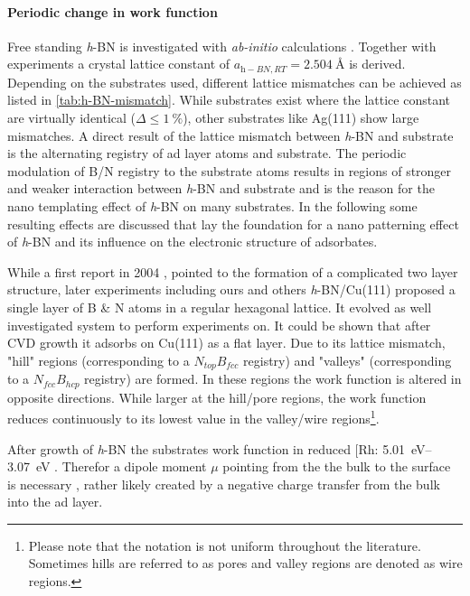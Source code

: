 \paragraph{Periodic change in work function}
Free standing \textit{h}-BN is investigated with \textit{ab-initio} calculations \cite{han_effects_2014,mortazavi_investigation_2012,topsakal_first-principles_2009,peng_mechanical_2012}. Together with experiments \cite{paszkowicz_lattice_2002} a crystal lattice constant of $a_{\textit{h}-BN, RT}=\SI{2.504}{\angstrom}$ is derived. Depending on the substrates used, different lattice mismatches can be achieved as listed in \autoref{tab:h-BN-mismatch}. While substrates exist where the lattice constant are virtually identical ($\Delta \leq \SI{1}{\percent}$), other substrates like Ag(111) show large mismatches. A direct result of the lattice mismatch between \textit{h}-BN and substrate is the alternating registry of ad layer atoms and substrate. The periodic modulation of B/N registry to the substrate atoms results in regions of stronger and weaker interaction between \textit{h}-BN and substrate and is the reason for the nano templating effect of \textit{h}-BN on many substrates. In the following some resulting effects are discussed that lay the foundation for a nano patterning effect of \textit{h}-BN and its influence on the electronic structure of adsorbates.

While a first report in 2004 \cite{corso_boron_2004}, pointed to the formation of a complicated two layer structure, later experiments \cite{roth_chemical_2013, li_grain_2015} including ours \cite{joshi_boron_2012, schwarz_corrugation_2017} and others \textit{h}-BN/Cu(111) proposed a single layer of B \& N atoms in a regular hexagonal lattice. It evolved as well investigated system to perform experiments on. It could be shown that after CVD growth it adsorbs on Cu(111) as a flat layer. Due to its  lattice mismatch, "hill" regions  (corresponding to a $N_{top}B_{fcc}$ registry) and "valleys" (corresponding to a $N_{fcc}B_{hcp}$ registry) are formed. In these regions the work function is altered in opposite directions. While larger at the hill/pore regions, the work function reduces continuously to its lowest value in the valley/wire regions\footnote{Please note that the notation is not uniform throughout the literature. Sometimes hills are referred to as pores and valley regions are denoted as wire regions.}. 

After growth of \textit{h}-BN the substrates work function in reduced [Rh: \SIrange{5.01}{3.07}{\eV} \cite{gomez_diaz_hexagonal_2013}. Therefor a dipole moment $\mu$ pointing from the the bulk to the surface is necessary \cite{roman_periodic_2013}, rather likely created by a negative charge transfer from the bulk into the ad layer.

